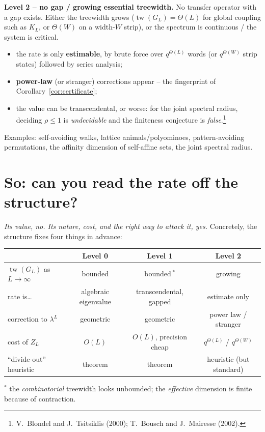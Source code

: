 \documentclass[11pt]{article}
\newcommand{\tw}{\operatorname{tw}}
\newcommand{\spec}{\rho}
\newcommand{\F}[1]{\smallskip\noindent\textbf{\textsf{#1.}}\hspace{0.4em}}
\theoremstyle{plain}
\theoremstyle{definition}
\begin{document}
\F{Level 2 -- no gap / growing essential treewidth} No transfer operator with a
gap exists. Either the treewidth grows ($\tw(G_L)=\Theta(L)$ for global coupling
such as $K_L$, or $\Theta(W)$ on a width-$W$ strip), or the spectrum is
continuous / the system is critical.
\begin{itemize}[itemsep=1pt]
\item the rate is only \textbf{estimable}, by brute force over $q^{\Theta(L)}$
words (or $q^{\Theta(W)}$ strip states) followed by series analysis;
\item \textbf{power-law} (or stranger) corrections appear -- the fingerprint of
Corollary~\ref{cor:certificate};
\item the value can be transcendental, or worse: for the joint spectral radius,
deciding $\spec\le1$ is \emph{undecidable} and the finiteness conjecture is
\emph{false}.\footnote{V.~Blondel and J.~Tsitsiklis (2000); T.~Bousch and
J.~Mairesse (2002).}
\end{itemize}
Examples: self-avoiding walks, lattice animals/polyominoes, pattern-avoiding
permutations, the affinity dimension of self-affine sets, the joint spectral
radius.

\section{So: can you read the rate off the structure?}

\emph{Its value, no. Its nature, cost, and the right way to attack it, yes.}
Concretely, the structure fixes four things in advance:

\begin{center}
\renewcommand{\arraystretch}{1.25}
\small
\begin{tabular}{@{}lccc@{}}
\toprule
 & \textbf{Level 0} & \textbf{Level 1} & \textbf{Level 2}\\
\midrule
$\tw(G_L)$ as $L\to\infty$ & bounded & bounded\,$^\ast$ & growing\\
rate is\ldots & algebraic eigenvalue & transcendental, gapped & estimate only\\
correction to $\lambda^L$ & geometric & geometric & power law / stranger\\
cost of $Z_L$ & $O(L)$ & $O(L)$, precision cheap & $q^{\Theta(L)}$ / $q^{\Theta(W)}$\\
``divide-out'' heuristic & theorem & theorem & heuristic (but standard)\\
\bottomrule
\end{tabular}
\end{center}
{\footnotesize $^\ast$ the \emph{combinatorial} treewidth looks unbounded;
the \emph{effective} dimension is finite because of contraction.}
\end{document}
